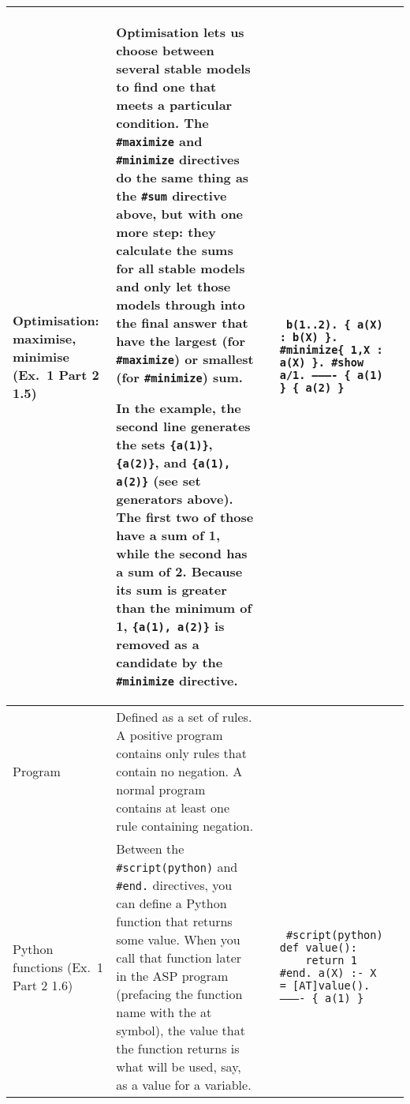 \documentclass[9pt,a4paper,landscape]{article}
\begin{document}
{\begin{longtable}{Lp{14.5cm}lXX}
Optimisation: maximise, minimise \newline (Ex.\ 1 Part 2 1.5)
& Optimisation lets us choose between several stable models to find one that meets a particular condition. The \texttt{\#maximize} and \texttt{\#minimize} directives do the same thing as the \texttt{\#sum} directive above, but with one more step: they calculate the sums for all stable models and only let those models through into the final answer that have the largest (for \texttt{\#maximize}) or smallest (for \texttt{\#minimize}) sum. \newline

In the example, the second line generates the sets \texttt{\{a(1)\}}, \texttt{\{a(2)\}}, and \texttt{\{a(1), a(2)\}} (see set generators above).
The first two of those have a sum of 1, while the second has a sum of 2.
Because its sum is greater than the minimum of 1, \texttt{\{a(1), a(2)\}} is removed as a candidate by the \texttt{\#minimize} directive.

&& {\footnotesize\texttt{%
		b(1..2). \{ a(X) : b(X) \}.\newline
		\#minimize\{ 1,X : a(X) \}.\newline
		\#show a/1.\newline
		---------- \newline
		\{ a(1) \} \newline
		\{ a(2) \} \newline
}} &\\  \midrule







Program
& Defined as a set of rules. A positive program contains only rules that contain no negation. A normal program contains at least one rule containing negation. &&&\\ \midrule

Python functions \newline (Ex.\ 1 Part 2 1.6)
& Between the \texttt{\#script(python)} and \texttt{\#end.} directives, you can define a Python function that returns some value.
When you call that function later in the ASP program (prefacing the function name with the at symbol), the value that the function returns is what will be used, say, as a value for a variable.

&& {\small\texttt{%
		\#script(python) \newline
		def value(): \newline
		\mbox{~~~~}return 1 \newline
		\#end. \newline \newline
		a(X) :- X = [AT]value(). \newline
		---------- \newline
		\{ a(1) \}
}} \\ \midrule


\end{longtable}}
\end{document}

